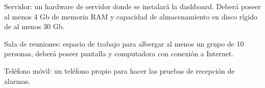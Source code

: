 \documentclass[11pt]{proyecto}
\begin{document}
Servidor: un hardware de servidor donde se instalará la dashboard. Deberá poseer al menos 4 Gb de memoria RAM y capacidad de almacenamiento en disco rígido de al menos 30 Gb. 

Sala de reuniones: espacio de trabajo para albergar al menos un grupo de 10 personas, deberá poseer pantalla y computadora con conexión a Internet.

Teléfono móvil: un teléfono propio para hacer las pruebas de recepción de alarmas.

\begin{table}

\centering
{}
\end{table}
\end{document}
